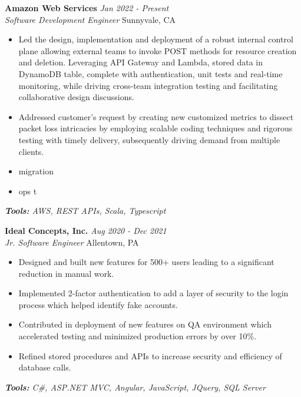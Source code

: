 \documentclass[letterpaper,10pt]{article}
\newcommand{\organization}[4]{
    \vspace{1.5pt}
    \textbf{#1} \hfill{\emph{#2}} \\
    \emph{#3} \hfill{#4} \\
    \vspace{3pt}
}
\newcommand{\toolsused}[1]{
    \vspace{1.5pt}
    \emph{#1}\\
    \vspace{3pt}
}
\newcommand{\bulletsBegin}{
    \vspace{1pt}
    \begin{minipage}{17.6cm}
    \begin{itemize}[leftmargin=0.6cm]
    \setlength\itemsep{-0.1em}
}
\newcommand{\bulletsEnd}{
    \end{itemize}\vspace{0pt}
    \end{minipage}
}
\begin{document}
    	\organization{Amazon Web Services}{Jan 2022 - Present}
        {Software Development Engineer}{Sunnyvale, CA}
        \bulletsBegin
            \item Led the design, implementation and deployment of a robust internal control plane allowing external teams to invoke POST methods for resource creation and deletion. Leveraging API Gateway and Lambda, stored data in DynamoDB table, complete with authentication, unit tests and real-time monitoring, while driving cross-team integration testing and facilitating collaborative design discussions.
	    \vspace{-2pt}
            \item Addressed customer's request by creating new customized metrics to dissect packet loss intricacies by employing scalable coding techniques and rigorous testing with timely delivery, subsequently driving demand from multiple clients.
            \item migration
            \vspace{-2pt}
            \item ops t
            \vspace{-2pt}
        \bulletsEnd
        \vspace{-4pt}
        \toolsused{\textbf{Tools:} AWS, REST APIs, Scala, Typescript}

    
    	\organization{Ideal Concepts, Inc.}{Aug 2020 - Dec 2021}
        {Jr. Software Engineer}{Allentown, PA}
        \bulletsBegin
            \item Designed and built new features for 500+ users leading to a significant reduction in manual work.
	    \vspace{-2pt}
            \item Implemented 2-factor authentication to add a layer of security to the login process which helped identify fake accounts.
            \item Contributed in deployment of new features on QA environment which accelerated testing and minimized production errors by over 10\%.
            \vspace{-2pt}
            \item Refined stored procedures and APIs to increase security and efficiency of database calls.
            \vspace{-2pt}
        \bulletsEnd
        \vspace{-4pt}
        \toolsused{\textbf{Tools:} C\#, ASP.NET MVC, Angular, JavaScript, JQuery, SQL Server}
\end{document}
